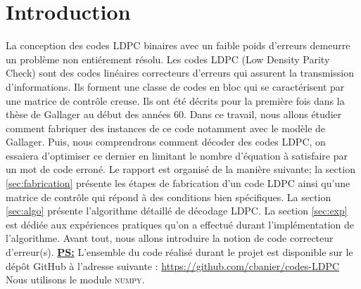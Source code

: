\documentclass[french,nochapter,11pt]{rapportUB}
\begin{document}
\section{Introduction}
\label{sec:introduction}
La conception des codes LDPC binaires avec un faible poids d'erreurs demeurre un problème non entiérement résolu. 
Les codes LDPC (Low Density Parity Check) sont des codes linéaires correcteurs d'erreurs qui assurent la transmission d'informations. 
Ils forment une classe de codes en bloc qui se caractérisent par une matrice de contrôle creuse. Ils ont été décrits pour la première 
fois dans la thèse de Gallager au début des années 60. Dans ce travail, nous allons étudier comment fabriquer des instances de ce code 
notamment avec le modèle de Gallager. Puis, nous comprendrons comment décoder des codes LDPC, on essaiera d'optimiser ce dernier en limitant
le nombre d'équation à satisfaire par un mot de code erroné.\vspace{0.4cm}\newline
Le rapport est organisé de la manière suivante; la section \ref{sec:fabrication} présente les étapes de fabrication d'un code LDPC 
ainsi qu'une matrice de contrôle qui répond à des conditions bien spécifiques. La section \ref{sec:algo} présente l'algorithme 
détaillé de décodage LDPC. La section \ref{sec:exp} est dédiée aux expériences pratiques qu'on a effectué durant l'implémentation 
de l'algorithme.\vspace{0.4cm}\newline
Avant tout, nous allons introduire la notion de code correcteur d'erreur(s).\vspace{0.7cm}\newline
\textbf{\underline{PS:}} L'ensemble du code réalisé durant le projet est disponible sur le dépôt GitHub à l'adresse suivante : \url{https://github.com/cbanier/codes-LDPC}
\newline Nous utilisons le module \textsc{numpy}.
\clearpage

\end{document}
